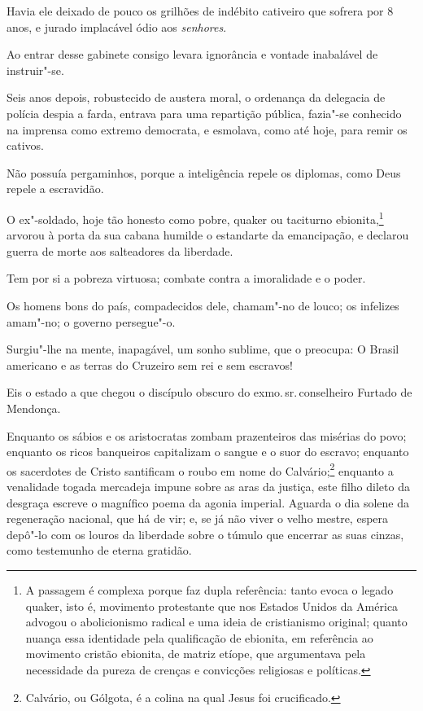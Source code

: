 Havia ele deixado de pouco os grilhões de indébito cativeiro que sofrera
por 8 anos, e jurado implacável ódio aos \emph{senhores}.

Ao entrar desse gabinete consigo levara ignorância e vontade inabalável
de instruir"-se.

Seis anos depois, robustecido de austera moral, o ordenança da delegacia
de polícia despia a farda, entrava para uma repartição pública, fazia"-se
conhecido na imprensa como extremo democrata, e esmolava, como até hoje,
para remir os cativos.

Não possuía pergaminhos, porque a inteligência repele os diplomas, como
Deus repele a escravidão.

O ex"-soldado, hoje tão honesto como pobre, quaker ou taciturno
ebionita,\footnote{A passagem é complexa porque faz dupla referência:
  tanto evoca o legado quaker, isto é, movimento protestante que nos
  Estados Unidos da América advogou o abolicionismo radical e uma ideia
  de cristianismo original; quanto nuança essa identidade pela
  qualificação de ebionita, em referência ao movimento cristão ebionita,
  de matriz etíope, que argumentava pela necessidade da pureza de
  crenças e convicções religiosas e políticas.} arvorou à porta da sua
cabana humilde o estandarte da emancipação, e declarou guerra de morte
aos salteadores da liberdade.

Tem por si a pobreza virtuosa; combate contra a imoralidade e o poder.

Os homens bons do país, compadecidos dele, chamam"-no de louco; os
infelizes amam"-no; o governo persegue"-o.

Surgiu"-lhe na mente, inapagável, um sonho sublime, que o preocupa: O
Brasil americano e as terras do Cruzeiro sem rei e sem escravos!

Eis o estado a que chegou o discípulo obscuro do exmo.\,sr.\,conselheiro
Furtado de Mendonça.

Enquanto os sábios e os aristocratas zombam prazenteiros das misérias do
povo; enquanto os ricos banqueiros capitalizam o sangue e o suor do
escravo; enquanto os sacerdotes de Cristo santificam o roubo em nome do
Calvário;\footnote{Calvário, ou Gólgota, é a colina na qual Jesus foi
  crucificado.} enquanto a
venalidade togada mercadeja impune sobre as aras da justiça, este filho
dileto da desgraça escreve o magnífico poema da agonia imperial. Aguarda
o dia solene da regeneração nacional, que há de vir; e, se já não viver
o velho mestre, espera depô"-lo com os louros da liberdade sobre o túmulo
que encerrar as suas cinzas, como testemunho de eterna gratidão.

